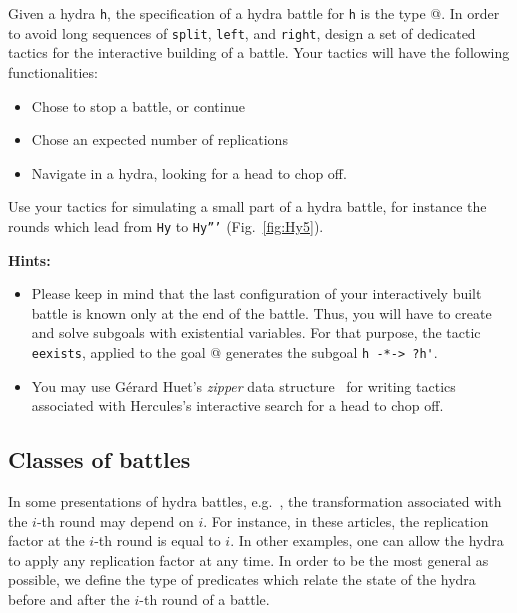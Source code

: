 \begin{exercise}
\label{exo:interactive-battle}
Given a hydra \texttt{h}, the specification of a hydra battle for \texttt{h} is the type 
@. In order to avoid long sequences of \texttt{split}, \texttt{left}, and 
\texttt{right}, design a set of dedicated tactics for the interactive building of a battle.
Your tactics will have the following functionalities:
\begin{itemize}
\item  Chose to stop a battle, or continue
\item Chose an expected number of replications
\item Navigate in a hydra, looking for a head to chop off.
\end{itemize}

Use your tactics for simulating a small part of a hydra battle, for instance the rounds which lead from
\texttt{Hy} to \texttt{Hy'''}  (Fig.~\vref{fig:Hy5}).

\textbf{Hints:} 
\begin{itemize}

\item Please keep in mind that the last  configuration of your interactively built battle is known only at the end of the battle. Thus, you will have to create and solve subgoals with existential variables. For that purpose, the tactic \texttt{eexists}, applied to the 
goal @ generates the subgoal \Verb|h -*-> ?h'|.
\item You may use Gérard Huet's \emph{zipper} data structure~\cite{zipper} for writing tactics associated with Hercules's  interactive search for a head to chop off.
\end{itemize}






\end{exercise}




\subsection{Classes of battles}
\label{sect:battle-classes}

In some presentations of hydra battles, e.g.~\cite{KP82, bauer2008}, the transformation associated with the $i$-th round may depend on $i$. For instance, in these articles, the replication factor at the $i$-th round is equal to $i$. In other examples, one can allow the hydra to apply any replication factor at any time. In order to be the most general as possible, we define the type of predicates which relate the state of the hydra before and after the $i$-th round of a battle.

